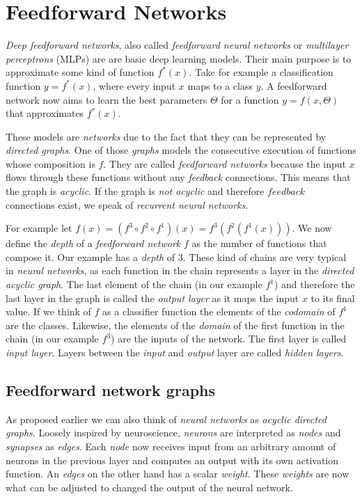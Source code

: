 \section{Feedforward Networks}
\emph{Deep feedforward networks}, also called \emph{feedforward neural networks} or \emph{multilayer perceptrons} (MLPs) are are basic deep learning models.
Their main purpose is to approximate some kind of function \(f^*(x)\).
Take for example a classification function \(y = f^*(x)\), where every input \(x\) maps to a class \(y\).
A feedforward network now aims to learn the best parameters \(\Theta\) for a function \(y = f(x, \Theta)\) that approximates \(f^*(x)\).

These models are \emph{networks} due to the fact that they can be represented by \emph{directed graphs}.
One of those \emph{graphs} models the consecutive execution of functions whose composition is \(f\).
They are called \emph{feedforward networks} because the input \(x\) flows through these functions without any \emph{feedback} connections.
This means that the graph is \emph{acyclic}.
If the graph is \emph{not acyclic} and therefore \(feedback\) connections exist, we speak of \emph{recurrent neural networks}.

For example let \(f(x) = (f^3 \circ f^2 \circ f^1)(x) = f^3(f^2(f^1(x)))\).
We now define the \emph{depth} of a \emph{feedforward network} \(f\) as the number of functions that compose it.
Our example has a \emph{depth} of \(3\).
These kind of chains are very typical in \emph{neural networks}, as each function in the chain represents a layer in the \emph{directed acyclic graph}.
The last element of the chain (in our example \(f^1\)) and therefore the last layer in the graph is called the \emph{output layer} as it maps the input \(x\) to its final value.
If we think of \(f\) as a classifier function the elements of the \emph{codomain} of \(f^1\) are the classes.
Likewise, the elements of the \emph{domain} of the first function in the chain (in our example \(f^3\)) are the inputs of the network.
The first layer is called \emph{input layer}.
Layers between the \emph{input} and \emph{output} layer are called \emph{hidden layers}.

\subsection{Feedforward network graphs}
As proposed earlier we can also think of \emph{neural networks} as \emph{acyclic directed graphs}.
Loosely inspired by neuroscience, \emph{neurons} are interpreted as \emph{nodes} and \emph{synapses} as \emph{edges}.
Each \emph{node} now receives input from an arbitrary amount of neurons in the previous layer and computes an output with its own activation function.
An \emph{edges} on the other hand has a scalar \emph{weight}.
These \emph{weights} are now what can be adjusted to changed the output of the neural network.

